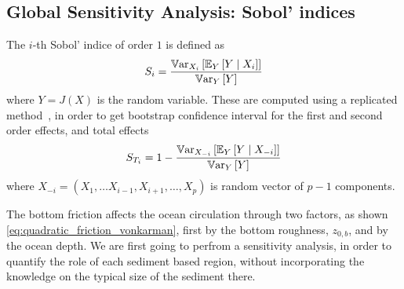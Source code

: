\documentclass[../../Main_ManuscritThese.tex]{subfiles}
\newcommand{\zob}{z_{0,b}}
\begin{document}
\subsection{Global Sensitivity Analysis: Sobol' indices}
\label{sec:sobol-indices}
\cite{janon_analyse_2012}
The $i$-th Sobol' indice of order $1$ is defined as 
\begin{equation}
  S_i = \frac{\mathbb{V}\mathrm{ar}_{X_i}\left[\mathbb{E}_{Y}\left[Y \mid X_i\right]\right]}{\mathbb{V}\mathrm{ar}_{Y}\left[Y\right]}
\end{equation}
where $Y = J(X)$ is the random variable. These are computed using a
replicated
method~\cite{gilquin_making_2019,gilquin_echantillonnages_2016}, in
order to get bootstrap confidence interval for the first and second
order effects, and total effects
\begin{equation}
 S_{T_i} = 1 - \frac{\mathbb{V}\mathrm{ar}_{X_{-i}}\left[\mathbb{E}_{Y}\left[Y \mid X_{-i}\right]\right]}{\mathbb{V}\mathrm{ar}_{Y}\left[Y\right]}
\end{equation}
where $X_{-i} = (X_1,\dots X_{i-1},X_{i+1},\dots,X_p)$ is random vector of $p-1$ components.

The bottom friction affects the ocean circulation through two factors,
as shown \cref{eq:quadratic_friction_vonkarman}, first by the bottom
roughness, $\zob$, and by the ocean depth. We are first going to
perfrom a sensitivity analysis, in order to quantify the role of each
sediment based region, without incorporating the knowledge on the
typical size of the sediment there.
\end{document}
